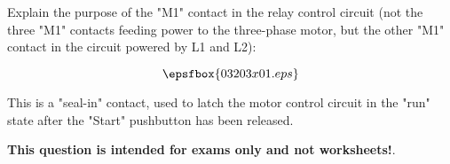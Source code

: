 

Explain the purpose of the "M1" contact in the relay control circuit (not the three "M1" contacts feeding power to the three-phase motor, but the other "M1" contact in the circuit powered by L1 and L2):

$$\epsfbox{03203x01.eps}$$







This is a "seal-in" contact, used to latch the motor control circuit in the "run" state after the "Start" pushbutton has been released.







{\bf This question is intended for exams only and not worksheets!}.





